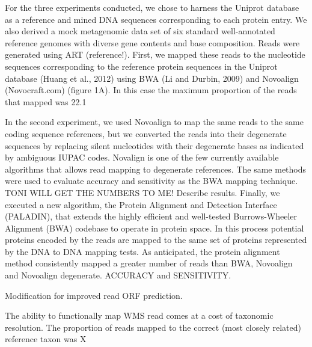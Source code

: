 For the three experiments conducted, we chose to harness the Uniprot database as a reference and mined DNA sequences corresponding to each protein entry. We also derived a mock metagenomic data set of six standard well-annotated reference genomes with diverse gene contents and base composition.  Reads were generated using ART (reference!). 
First, we mapped these reads to the nucleotide sequences corresponding to the reference protein sequences in the Uniprot database (Huang et al., 2012) using BWA (Li and Durbin, 2009) and Novoalign (Novocraft.com) (figure 1A). In this case the maximum proportion of the reads that mapped was 22.1%

In the second experiment, we used Novoalign to map the same reads to the same coding sequence references, but we converted the reads into their degenerate sequences by replacing silent nucleotides with their degenerate bases as indicated by ambiguous IUPAC codes. Novalign is one of the few currently available algorithms that allows read mapping to degenerate references. The same methods were used to evaluate accuracy and sensitivity as the BWA mapping technique. TONI WILL GET THE NUMBERS TO ME!  Describe results.
Finally, we executed a new algorithm, the Protein Alignment and Detection Interface (PALADIN), that extends the highly efficient and well-tested Burrows-Wheeler Alignment (BWA) codebase to operate in protein space.  In this process potential proteins encoded by the reads are mapped to the same set of proteins represented by the DNA to DNA  mapping tests. As anticipated, the protein alignment method consistently mapped a greater number of reads than BWA, Novoalign and Novoalign degenerate. ACCURACY and SENSITIVITY.  

Modification for improved read ORF prediction. 

The ability to functionally map WMS read comes at a cost of taxonomic resolution.  The proportion of reads mapped to the correct (most closely related) reference taxon was X %


  
  
  